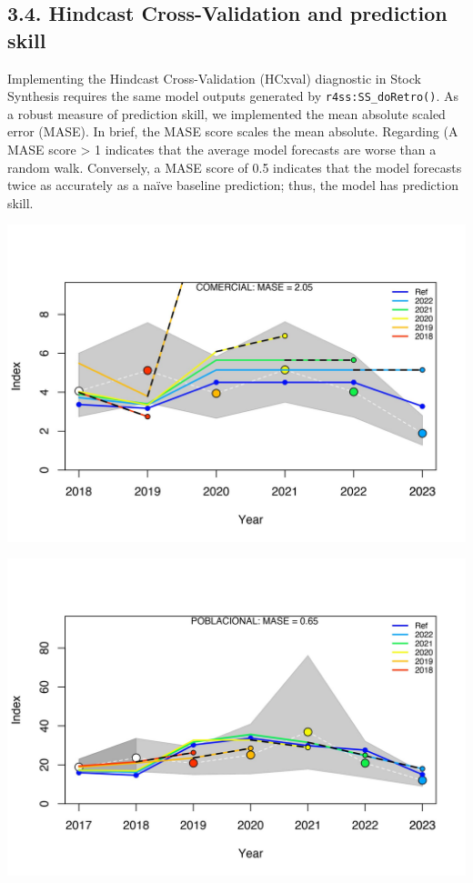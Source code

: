 \documentclass[
]{article}
\begin{document}
\hypertarget{hindcast-cross-validation-and-prediction-skill}{%
\subsection{3.4. Hindcast Cross-Validation and prediction skill}\label{hindcast-cross-validation-and-prediction-skill}}

Implementing the Hindcast Cross-Validation (HCxval) diagnostic in Stock Synthesis requires the same model outputs generated by \texttt{r4ss:SS\_doRetro()}. As a robust measure of prediction skill, we implemented the mean absolute scaled error (MASE). In brief, the MASE score scales the mean absolute. Regarding (A MASE score \textgreater{} 1 indicates that the average model forecasts are worse than a random walk. Conversely, a MASE score of 0.5 indicates that the model forecasts twice as
accurately as a naïve baseline prediction; thus, the model has prediction skill.

\begin{center}\includegraphics{Dtrunculus_SS3_2024_files/figure-latex/unnamed-chunk-15-1} \end{center}

\begin{center}\includegraphics{Dtrunculus_SS3_2024_files/figure-latex/unnamed-chunk-15-2} \end{center}
\end{document}

